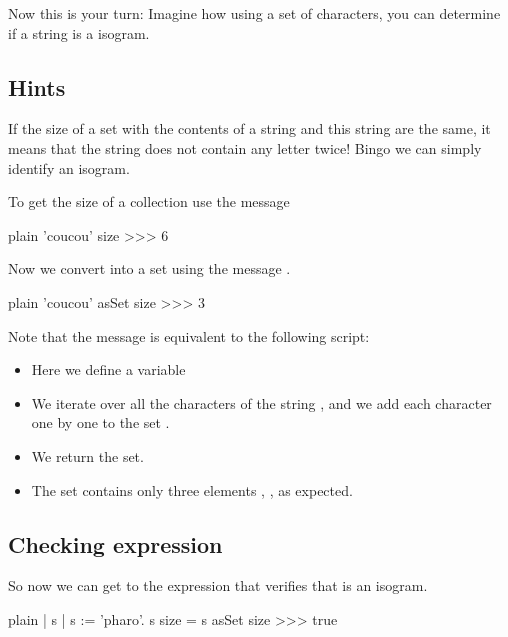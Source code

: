 \documentclass[10pt,twoside,english]{_support/latex/sbabook/sbabook}
\begin{document}
Now this is your turn: Imagine how using a set of characters, you can determine if a string is a isogram.
\subsection{Hints}
If the size of a set with the contents of a string and this string are the same, it means that the string does not contain any letter twice! Bingo we can simply identify an isogram. 

To get the size of a collection use the message  

\begin{displaycode}{plain}
'coucou' size 
>>> 6
\end{displaycode}

Now we convert  into a set using the message .

\begin{displaycode}{plain}
'coucou' asSet size
>>> 3
\end{displaycode}

Note that the message  is equivalent to the following script:


\begin{itemize}
\item Here we define a variable 
\item We iterate over all the characters of the string , and we add each character one by one to the set .
\item We return the set.
\item The set contains only three elements , ,  as expected. 
\end{itemize}
\subsection{Checking expression}
So now we can get to the expression that verifies that  is an isogram. 

\begin{displaycode}{plain}
| s | 
s := 'pharo'.
s size = s asSet size 
>>> true
\end{displaycode}
\end{document}
